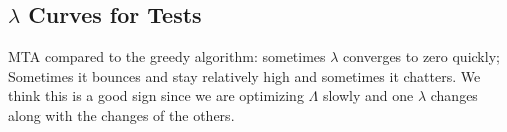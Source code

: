 \subsection{$\lambda$ Curves for Tests}
MTA compared to the greedy algorithm: sometimes $\lambda$ converges to zero quickly; Sometimes it bounces and stay relatively high and sometimes it chatters. We think this is a good sign since we are optimizing $\Lambda$ slowly and one $\lambda$ changes along with the changes of the others.
\begin{figure}
\centering
\begin{adjustwidth}{-1.2in}{-1.2in}
\hfill
{}
\hfill
{}


\end{adjustwidth}
\end{figure}
